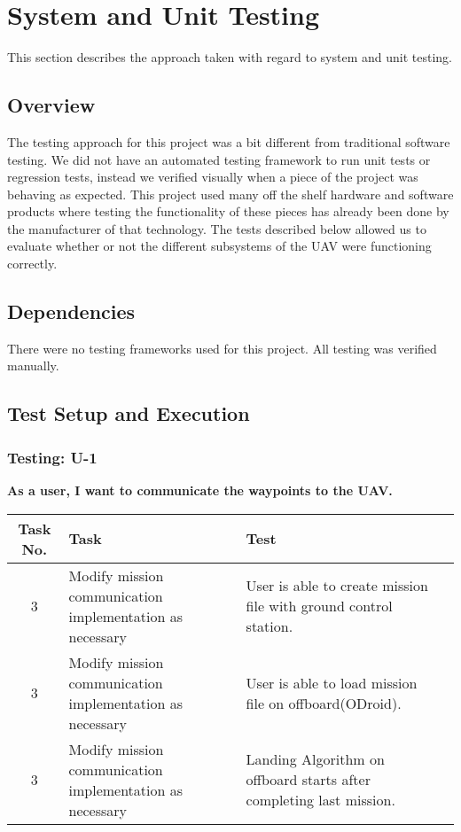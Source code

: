 
\chapter{System  and Unit Testing}

This section describes the approach taken with regard to system and unit testing. 

\section{Overview}
The testing approach for this project was a bit different from traditional software testing. We did not have an automated testing framework to run unit tests or regression tests, instead we verified visually when a piece of the project was behaving as expected. This project used many off the shelf hardware and software products where testing the functionality of these pieces has already been done by the manufacturer of that technology. The tests described below allowed us to evaluate whether or not the different subsystems of the UAV were functioning correctly.

\section{Dependencies}
There were no testing frameworks used for this project. All testing was verified manually.


\section{Test Setup and Execution}
\subsection{Testing: U-1}
\textbf{As a user, I want to communicate the waypoints to the UAV.}\\
\begin{tabular}{| c | >{\raggedright}m{4cm} | m{4cm} | c |}\hline
	Task No. & Task & Test\\\hline
	3 & Modify mission communication implementation as necessary & User is able to create mission file with ground control station.\\\hline
	3 & Modify mission communication implementation as necessary & User is able to load mission file on offboard(ODroid).\\\hline
	3 & Modify mission communication implementation as necessary & Landing Algorithm on offboard starts after completing last mission.\\\hline
	
\end{tabular}

